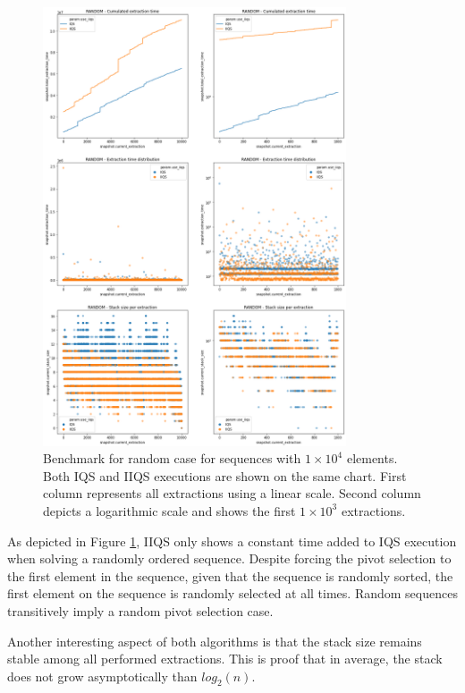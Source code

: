 \begin{figure}[!ht]
    \centering
    \includegraphics[width=0.8\textwidth]{./fragments/04_experimental_execution/images/01_basebenchmark_01_random_case.png}
    \caption{Benchmark for random case for sequences with $1\times10^4$ elements. Both IQS and IIQS executions are shown on the same chart. First column represents all extractions using a linear scale. Second column depicts a logarithmic scale and shows the first $1\times10^3$ extractions.}
    \label{FIG:BENCHMARK_01_RANDOM_CASE}
\end{figure}

As depicted in Figure \ref{FIG:BENCHMARK_01_RANDOM_CASE}, IIQS only shows a constant time added to IQS execution when solving a randomly ordered sequence. Despite forcing the pivot selection to the first element in the sequence, given that the sequence is randomly sorted, the first element on the sequence is randomly selected at all times. Random sequences transitively imply a random pivot selection case.

Another interesting aspect of both algorithms is that the stack size remains stable among all performed extractions. This is proof that in average, the stack does not grow asymptotically than $log_2(n)$.


